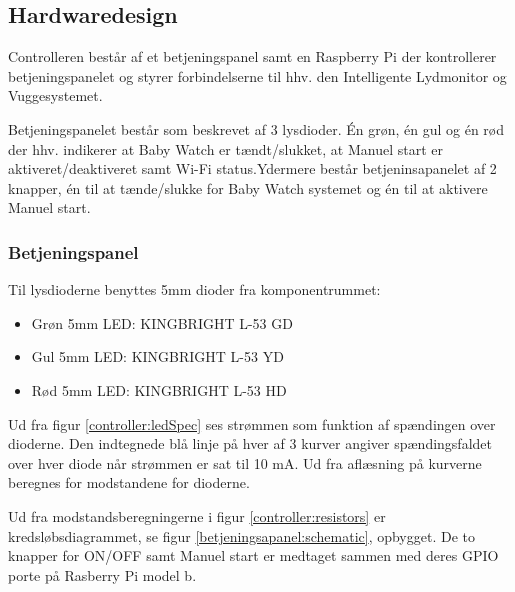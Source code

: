 \subsection*{Hardwaredesign}

Controlleren består af et betjeningspanel samt en Raspberry Pi der kontrollerer betjeningspanelet og styrer forbindelserne til hhv. den Intelligente Lydmonitor og Vuggesystemet.

Betjeningspanelet består som beskrevet af 3 lysdioder. Én grøn, én gul og én rød der hhv. indikerer at Baby Watch er tændt/slukket, at Manuel start er aktiveret/deaktiveret samt Wi-Fi status.Ydermere består betjeninsapanelet af 2 knapper, én til at tænde/slukke for Baby Watch systemet og én til at aktivere Manuel start.
 
\subsubsection*{Betjeningspanel}

Til lysdioderne benyttes 5mm dioder fra komponentrummet: 

\begin{itemize}
	\item Grøn 5mm LED: KINGBRIGHT L-53 GD
	\item Gul 5mm LED: KINGBRIGHT L-53 YD
	\item Rød 5mm LED: KINGBRIGHT L-53 HD
\end{itemize}



Ud fra figur \ref{controller:ledSpec} ses strømmen som funktion af spændingen over dioderne. Den indtegnede blå linje på hver af 3 kurver angiver spændingsfaldet over hver diode når strømmen er sat til 10 mA. Ud fra aflæsning på kurverne beregnes for modstandene for dioderne.


Ud fra modstandsberegningerne i figur \ref{controller:resistors} er kredsløbsdiagrammet, se figur \ref{betjeningsapanel:schematic}, opbygget. De to knapper for ON/OFF samt Manuel start er medtaget sammen med deres GPIO porte på Rasberry Pi model b.


